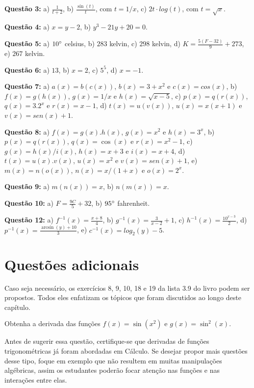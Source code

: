 \documentclass[main_estudante.tex]{subfiles}
\begin{document}
\noindent\textbf{Questão 3:} a) $\frac{1}{t+2}$, b) $\frac{\sin(t)}{t}$, com $t=1/x$, c) $2t \cdot log(t)$, com $t=\sqrt{x}$.

\noindent\textbf{Questão 4:} a) $x=y-2$, b) $y^3-21y+20=0$.

\noindent\textbf{Questão 5:} a) $10\degree$ celsius, b) $283$ kelvin, c) $298$ kelvin, d) $K=\frac{5(F-32)}{9}+273$, e) $267$ kelvin.

\noindent\textbf{Questão 6:} a) $13$, b) $x=2$, c) $5^5$, d) $x=-1$.

\noindent\textbf{Questão 7:} a) $a(x)=b(c(x))$, $b(x)=3+x^2$ e $c(x)=cos(x)$, b) $f(x)=g(h(x))$, $g(x)=1/x$ e $h(x)=\sqrt{x-5}$, c) $p(x)=q(r(x))$, $q(x)=3.2^x$ e $r(x)=x-1$, d) $t(x)=u(v(x))$, $u(x)=x(x+1)$ e $v(x)=sen(x)+1$.

\noindent\textbf{Questão 8:} a) $f(x)=g(x).h(x)$, $g(x)=x^2$ e $h(x)=3^x$, b) $p(x)=q(r(x))$, $q(x)=\cos(x)$ e $r(x)=x^2-1$, c) $g(x)=h(x)/i(x)$, $h(x)=x+3$ e $i(x)=x+4$, d) $t(x)=u(x).v(x)$, $u(x)=x^2$ e $v(x)=sen(x)+1$, e) $m(x)=n(o(x))$, $n(x)=x/(1+x)$ e $o(x)=2^x$.

\noindent\textbf{Questão 9:} a) $m(n(x))=x$, b) $n(m(x))=x$.

\noindent\textbf{Questão 10:} a) $F=\frac{9C}{5}+32$, b) $95\degree$ fahrenheit.

\noindent\textbf{Questão 12:} a) $f^{-1}(x)=\frac{x+8}{4}$, b) $g^{-1}(x)=\frac{3}{x-2}+1$, c) $h^{-1}(x)=\frac{10^{x-3}}{2}$, d) $p^{-1}(x)=\frac{\arcsin(y)+10}{3}$, e) $c^{-1}(x)=log_2 (y)-5$.

\section{Questões adicionais}

Caso seja necessário, os exercícios 8, 9, 10, 18 e 19 da lista 3.9 do livro  podem ser propostos. Todos eles enfatizam os tópicos que foram discutidos ao longo deste capítulo.

\begin{adicional}
Obtenha a derivada das funções $f(x)=\sin(x^2)$ e $g(x)=\sin^2(x)$.
\end{adicional}

Antes de sugerir essa questão, certifique-se que derivadas de funções trigonométricas já foram abordadas em Cálculo. Se desejar propor mais questões desse tipo, foque em exemplo que não resultem em muitas manipulações algébricas, assim os estudantes poderão focar atenção nas funções e nas interações entre elas.
\end{document}
